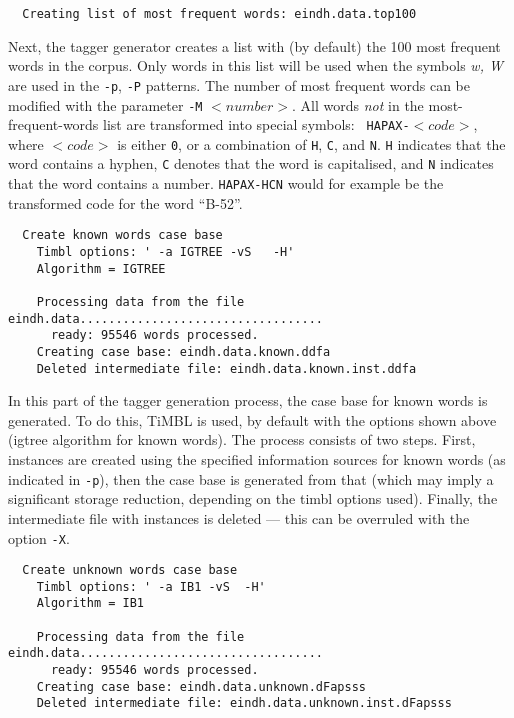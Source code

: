 \documentclass{report}
\begin{document}
{\small
\begin{verbatim}
  Creating list of most frequent words: eindh.data.top100
\end{verbatim}
}

Next, the tagger generator creates a list with (by default) the 100
most frequent words in the corpus. Only words in this list will be
used when the symbols {\em w, W} are used in the {\tt -p}, {\tt -P}
patterns. The number of most frequent words can be modified with the
parameter {\tt -M} $<number>$. All words {\em not}\/ in the
most-frequent-words list are transformed into special symbols: {\tt
HAPAX-}$<code>$, where $<code>$ is either {\tt 0}, or a combination of
{\tt H}, {\tt C}, and {\tt N}. {\tt H} indicates that the word
contains a hyphen, {\tt C} denotes that the word is capitalised, and
{\tt N} indicates that the word contains a number. {\tt HAPAX-HCN}
would for example be the transformed code for the word ``B-52''.

{\small
\begin{verbatim}
  Create known words case base
    Timbl options: ' -a IGTREE -vS   -H'
    Algorithm = IGTREE

    Processing data from the file eindh.data..................................
      ready: 95546 words processed.
    Creating case base: eindh.data.known.ddfa
    Deleted intermediate file: eindh.data.known.inst.ddfa
\end{verbatim}
}

In this part of the tagger generation process, the case base for known
words is generated. To do this, TiMBL is used, by default with
the options shown above ({\sc igtree} algorithm for known
words). The process consists of two steps. First, instances are
created using the specified information sources for known words (as
indicated in {\tt -p}), then the case base is generated from that (which
may imply a significant storage reduction, depending on the {\sc
timbl} options used). Finally, the intermediate file with instances is
deleted --- this can be overruled with the option {\tt -X}.

{\small
\begin{verbatim}
  Create unknown words case base
    Timbl options: ' -a IB1 -vS  -H'
    Algorithm = IB1

    Processing data from the file eindh.data..................................
      ready: 95546 words processed.
    Creating case base: eindh.data.unknown.dFapsss
    Deleted intermediate file: eindh.data.unknown.inst.dFapsss
\end{verbatim}
}
\end{document}
